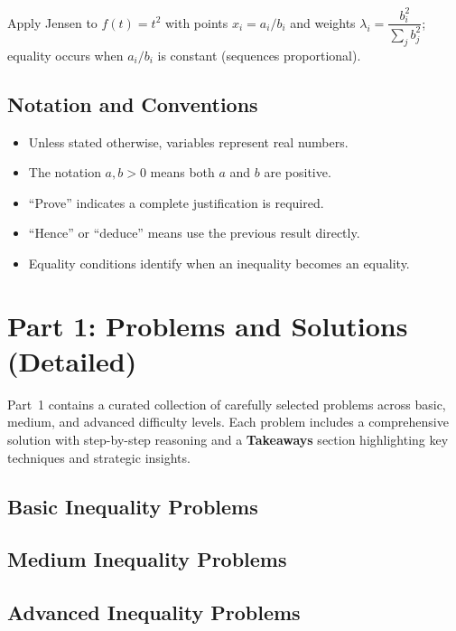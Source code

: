 \documentclass[12pt]{article}
\begin{document}
\begin{takeaways}
  \item Apply Jensen to $f(t)=t^2$ with points $x_i=a_i/b_i$ and weights $\lambda_i=\dfrac{b_i^2}{\sum_j b_j^2}$; equality occurs when $a_i/b_i$ is constant (sequences proportional).
\end{takeaways}

\subsection{Notation and Conventions}
\begin{itemize}[leftmargin=*]
  \item Unless stated otherwise, variables represent real numbers.
  \item The notation $a, b > 0$ means both $a$ and $b$ are positive.
  \item ``Prove'' indicates a complete justification is required.
  \item ``Hence'' or ``deduce'' means use the previous result directly.
  \item Equality conditions identify when an inequality becomes an equality.
\end{itemize}

\section{Part 1: Problems and Solutions (Detailed)}
Part~1 contains a curated collection of carefully selected problems across basic, medium, and advanced difficulty levels. Each problem includes a comprehensive solution with step-by-step reasoning and a \textbf{Takeaways} section highlighting key techniques and strategic insights.

\subsection{Basic Inequality Problems}


\subsection{Medium Inequality Problems}


\subsection{Advanced Inequality Problems}

\end{document}
